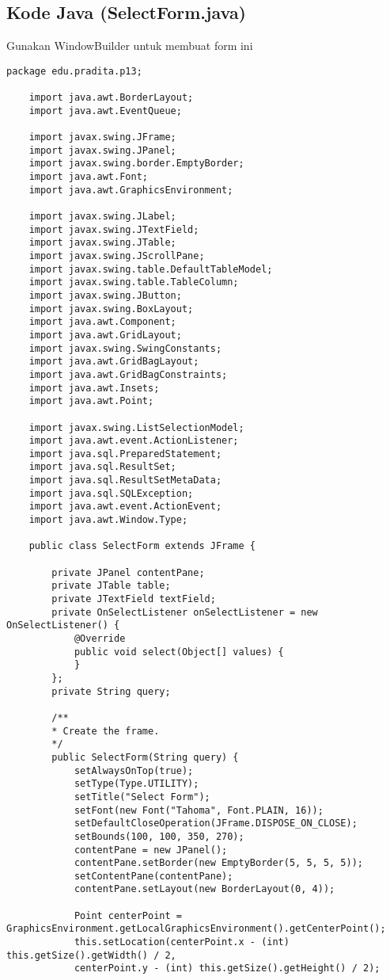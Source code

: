 \subsection{Kode Java (SelectForm.java)}

Gunakan WindowBuilder untuk membuat form ini

\begin{lstlisting}[style=JavaStyle]
	package edu.pradita.p13;
	
	import java.awt.BorderLayout;
	import java.awt.EventQueue;
	
	import javax.swing.JFrame;
	import javax.swing.JPanel;
	import javax.swing.border.EmptyBorder;
	import java.awt.Font;
	import java.awt.GraphicsEnvironment;
	
	import javax.swing.JLabel;
	import javax.swing.JTextField;
	import javax.swing.JTable;
	import javax.swing.JScrollPane;
	import javax.swing.table.DefaultTableModel;
	import javax.swing.table.TableColumn;
	import javax.swing.JButton;
	import javax.swing.BoxLayout;
	import java.awt.Component;
	import java.awt.GridLayout;
	import javax.swing.SwingConstants;
	import java.awt.GridBagLayout;
	import java.awt.GridBagConstraints;
	import java.awt.Insets;
	import java.awt.Point;
	
	import javax.swing.ListSelectionModel;
	import java.awt.event.ActionListener;
	import java.sql.PreparedStatement;
	import java.sql.ResultSet;
	import java.sql.ResultSetMetaData;
	import java.sql.SQLException;
	import java.awt.event.ActionEvent;
	import java.awt.Window.Type;
	
	public class SelectForm extends JFrame {
		
		private JPanel contentPane;
		private JTable table;
		private JTextField textField;
		private OnSelectListener onSelectListener = new OnSelectListener() {
			@Override
			public void select(Object[] values) {
			}
		};
		private String query;
		
		/**
		* Create the frame.
		*/
		public SelectForm(String query) {
			setAlwaysOnTop(true);
			setType(Type.UTILITY);
			setTitle("Select Form");
			setFont(new Font("Tahoma", Font.PLAIN, 16));
			setDefaultCloseOperation(JFrame.DISPOSE_ON_CLOSE);
			setBounds(100, 100, 350, 270);
			contentPane = new JPanel();
			contentPane.setBorder(new EmptyBorder(5, 5, 5, 5));
			setContentPane(contentPane);
			contentPane.setLayout(new BorderLayout(0, 4));
			
			Point centerPoint = GraphicsEnvironment.getLocalGraphicsEnvironment().getCenterPoint();
			this.setLocation(centerPoint.x - (int) this.getSize().getWidth() / 2,
			centerPoint.y - (int) this.getSize().getHeight() / 2);
			

\end{lstlisting}
